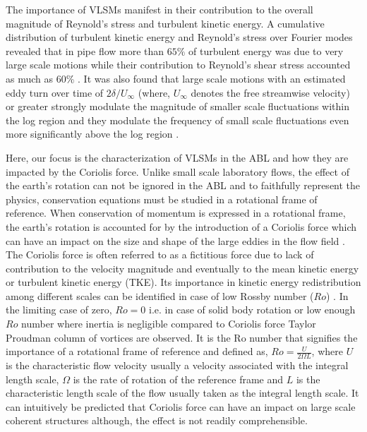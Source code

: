 \documentclass{amsart}
\begin{document}
The importance of VLSMs manifest in their  contribution to the overall magnitude of Reynold's stress and turbulent kinetic  energy.  A cumulative  distribution  of turbulent kinetic energy  and Reynold's stress  over Fourier modes revealed that in pipe flow  more than $65\%$ of turbulent energy was due to very large scale motions while their contribution to Reynold's shear stress accounted as much as $60\%$ \citep{guala_adrian_jfm2006}. It was also found that large scale motions with an estimated eddy turn over time of $2\delta/U_{\infty}$ (where, $U_{\infty}$ denotes the free streamwise velocity) or greater strongly modulate the magnitude of smaller scale fluctuations within the log region and they modulate the frequency of small scale fluctuations even more significantly above the log region \citep{ganapathi_jfm_2012_modulation}. 


Here, our focus is the characterization of VLSMs in the ABL and how they are impacted by the Coriolis force. Unlike small scale laboratory flows, the effect of the earth's rotation can not be ignored in the ABL and to faithfully represent the physics, conservation equations must be studied in a rotational frame of reference.  When conservation of momentum is expressed in a rotational frame, the earth's rotation is accounted for by the introduction of a Coriolis force which can have an impact on the size and shape of the large eddies in the flow field \citep{esau_jot_2002}. The Coriolis force is often referred to as a fictitious force due to lack of contribution to the velocity magnitude and eventually to the mean kinetic energy or turbulent kinetic energy (TKE). Its importance in kinetic energy redistribution among different scales can be identified in case of low Rossby number ($Ro$) \citep{yeung_zhou_pof_98,hossain_pof_94}. In the limiting case of zero, $Ro=0$  i.e. in case of solid body rotation or low enough $Ro$ number where inertia is negligible compared to Coriolis force Taylor Proudman column of vortices are observed. It is the Ro number that signifies the  importance of a rotational frame of reference and defined as,  $Ro=\frac{U}{2\Omega L}$, where $U$ is the characteristic flow velocity usually a velocity associated with the integral length scale, $\Omega$ is the rate of rotation of the reference frame and $L$ is the characteristic length scale of the flow usually taken as the integral length scale.   It can  intuitively be predicted that Coriolis force  can have an impact on large scale coherent structures although, the effect is not readily comprehensible.   
\end{document}
